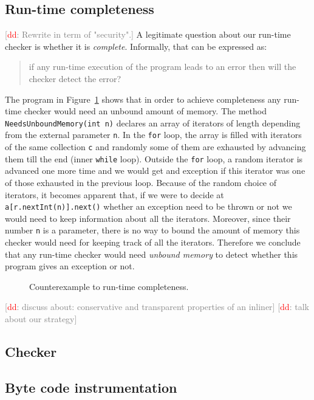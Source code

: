 \documentclass[10pt]{llncs} %
\newcommand{\noterg}[2]{\textcolor{gray}{[\textcolor{red}{#1}: #2]}}
\newcommand{\dd}[1]{\noterg{dd}{#1}}
\newcommand{\dinocomment}[1]{\dd{#1}}
\begin{document}
\subsection{Run-time completeness}
\dinocomment{Rewrite in term of "security".}
A legitimate question about our run-time checker is whether it is {\em complete}. Informally, that can be expressed as:
\begin{quote}
if any run-time execution of the program leads to an error then will the checker detect the error?
\end{quote}
The program in Figure~\ref{fig:completeness} shows that in order to achieve completeness any run-time checker would need an unbound amount of memory. The method {\tt NeedsUnboundMemory(int n)}  declares an array of iterators of length depending from the external parameter {\tt n}.  In the {\tt for} loop, the array is filled with iterators of the same collection {\tt c} and randomly some of them  are exhausted by advancing them till the end (inner {\tt while} loop).
Outside the {\tt for} loop, a random iterator is advanced one more time and we would get  and exception if this iterator 
was  one of those exhausted in the previous loop. Because of the random choice of iterators, it becomes apparent that, 
if we were to decide at {\tt a[r.nextInt(n)].next()} whether an exception need to be thrown or not we would need to keep information about all the iterators. Moreover, since their number {\tt n} is a parameter, there is no way to bound the amount of memory this checker would need for keeping track of all the iterators. Therefore we conclude that any run-time checker would need {\em unbound memory} to detect whether this program gives an exception or not. 
%
\begin{figure}[htbp]
\begin{center}

\caption{Counterexample to run-time completeness.}
\label{fig:completeness}
\end{center}
\end{figure}

\dinocomment{discuss about: conservative and transparent properties of an inliner}
\dinocomment{talk about our strategy}
\subsection{Checker}
\subsection{Byte code instrumentation}
\end{document}
